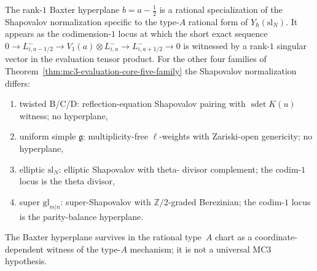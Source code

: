 \begin{proposition}
\label{prop:baxter-retraction-type-A-artifact}
%
%
The rank-$1$ Baxter hyperplane $b = a - \tfrac12$ is a rational
specialization of the Shapovalov normalization specific to the
type-$A$ rational form of $Y_\hbar(\mathrm{sl}_N)$. It appears as
the codimension-$1$ locus at which the short exact sequence
$0 \to L^-_{i,a-1/2} \to V_1(a) \otimes L^-_{i,a}
\to L^-_{i,a+1/2} \to 0$
is witnessed by a rank-$1$ singular vector in the evaluation
tensor product. For the other four families of
Theorem~\ref{thm:mc3-evaluation-core-five-family} the Shapovalov
normalization differs:
\begin{enumerate}[label=\textup{(\roman*)},nosep]
\item twisted B/C/D: reflection-equation Shapovalov pairing with
 $\operatorname{sdet}K(u)$ witness; no hyperplane,
\item uniform simple $\mathfrak{g}$: multiplicity-free
 $\ell$-weights with Zariski-open genericity; no hyperplane,
\item elliptic $\mathrm{sl}_N$: elliptic Shapovalov with theta-
 divisor complement; the codim-$1$ locus is the theta divisor,
\item super $\mathrm{gl}_{m|n}$: super-Shapovalov with
 $\mathbb{Z}/2$-graded Berezinian; the codim-$1$ locus is the
 parity-balance hyperplane.
\end{enumerate}
The Baxter hyperplane survives in the rational type~$A$ chart as a
coordinate-dependent witness of the type-$A$ mechanism; it is not a
universal MC3 hypothesis.
\end{proposition}

